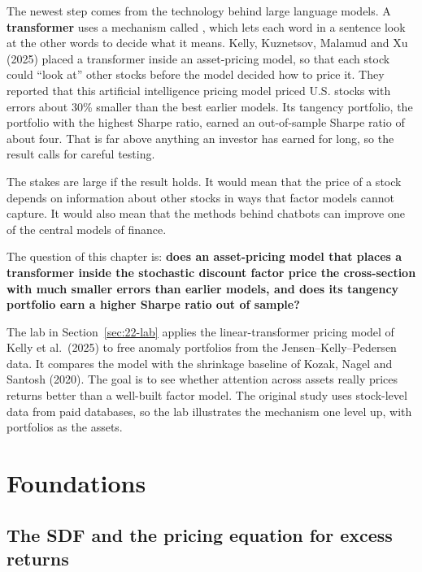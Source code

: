 The newest step comes from the technology behind large language models. A \textbf{transformer} uses a mechanism called , which lets each word in a sentence look at the other words to decide what it means. Kelly, Kuznetsov, Malamud and Xu (2025) placed a transformer inside an asset-pricing model, so that each stock could ``look at'' other stocks before the model decided how to price it. They reported that this artificial intelligence pricing model priced U.S. stocks with errors about 30\% smaller than the best earlier models. Its tangency portfolio, the portfolio with the highest Sharpe ratio, earned an out-of-sample Sharpe ratio of about four. That is far above anything an investor has earned for long, so the result calls for careful testing.

The stakes are large if the result holds. It would mean that the price of a stock depends on information about other stocks in ways that factor models cannot capture. It would also mean that the methods behind chatbots can improve one of the central models of finance. 

The question of this chapter is: \textbf{does an asset-pricing model that places a transformer inside the stochastic discount factor price the cross-section with much smaller errors than earlier models, and does its tangency portfolio earn a higher Sharpe ratio out of sample?}

The lab in Section~\ref{sec:22-lab} applies the linear-transformer pricing model of Kelly et al.\ (2025) to free anomaly portfolios from the Jensen--Kelly--Pedersen data. It compares the model with the shrinkage baseline of Kozak, Nagel and Santosh (2020). The goal is to see whether attention across assets really prices returns better than a well-built factor model. The original study uses stock-level data from paid databases, so the lab illustrates the mechanism one level up, with portfolios as the assets.


\section{Foundations}
\label{sec:22-foundations}

\subsection{The SDF and the pricing equation for excess returns}

